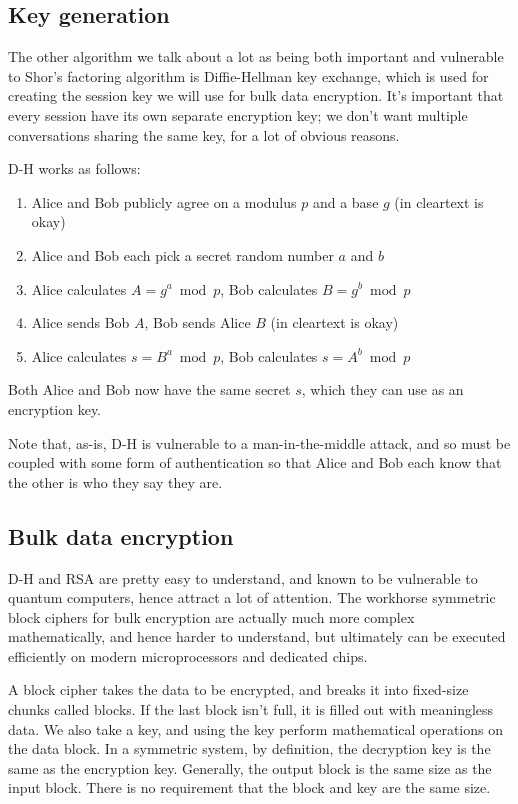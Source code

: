 \documentclass[%
 aip,
 jmp,%
 amsmath,amssymb,
 reprint,%
]{revtex4-1}
\begin{document}
\subsection{Key generation}

The other algorithm we talk about a lot as being both important and
vulnerable to Shor's factoring algorithm is Diffie-Hellman key
exchange, which is used for creating the session key we will use for
bulk data encryption.  It's important that every session have its own
separate encryption key; we don't want multiple conversations sharing
the same key, for a lot of obvious reasons.

D-H works as follows:

\begin{enumerate}
  \item Alice and Bob publicly agree on a modulus $p$ and a base $g$ (in cleartext is okay)
  \item Alice and Bob each pick a secret random number $a$ and $b$
  \item Alice calculates $A = g^a \bmod p$,
    Bob calculates $B = g^b \bmod p$
  \item Alice sends Bob $A$, Bob sends Alice $B$ (in cleartext is okay)
  \item Alice calculates $s = B^a \bmod p$,
	   Bob calculates $s = A^b \bmod p$
\end{enumerate}

Both Alice and Bob now have the same secret $s$, which they can use as
an encryption key.

Note that, as-is, D-H is vulnerable to a man-in-the-middle attack, and
so must be coupled with some form of authentication so that Alice and
Bob each know that the other is who they say they are.

\subsection{Bulk data encryption}

D-H and RSA are pretty easy to understand, and known to be vulnerable
to quantum computers, hence attract a lot of attention. The workhorse
symmetric block ciphers for bulk encryption are actually much more
complex mathematically, and hence harder to understand, but ultimately
can be executed efficiently on modern microprocessors and dedicated
chips.

A block cipher takes the data to be encrypted, and breaks it into
fixed-size chunks called blocks.  If the last block isn't full, it is
filled out with meaningless data.  We also take a key, and using the
key perform mathematical operations on the data block.  In a symmetric
system, by definition, the decryption key is the same as the
encryption key.  Generally, the output block is the same size as the
input block.  There is no requirement that the block and key are the
same size.
\end{document}
